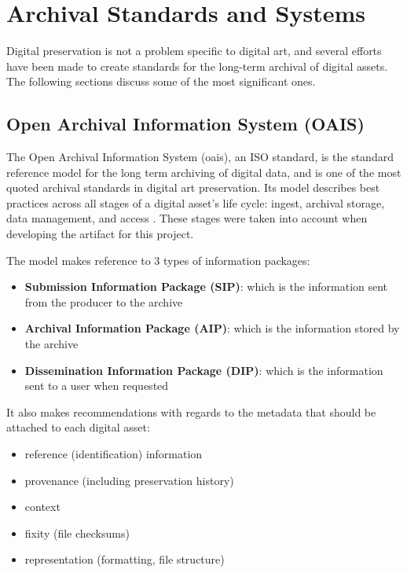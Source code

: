 \section{Archival Standards and Systems}

Digital preservation is not a problem specific to digital art, and several efforts have been made to create standards for the long-term archival of digital assets. The following sections discuss some of the most significant ones.

\subsection{Open Archival Information System (OAIS)}
\label{sub:oais}

The Open Archival Information System (\gls{oais}), an ISO standard, is the standard reference model for the long term archiving of digital data, and is one of the most quoted archival standards in digital art preservation. Its model describes best practices across all stages of a digital asset's life cycle: ingest, archival storage, data management, and access \cite{ccsdsReferenceModelOpen2012}. These stages were taken into account when developing the artifact for this project.

The model makes reference to 3 types of information packages:

\begin{itemize}
    \item \textbf{Submission Information Package (SIP)}: which is the information sent from the producer to the archive 
    \item \textbf{Archival Information Package (AIP)}: which is the information stored by the archive
    \item \textbf{Dissemination Information Package (DIP)}: which is the information sent to a user when requested
\end{itemize}

It also makes recommendations with regards to the metadata that should be attached to each digital asset:

\begin{itemize}
    \item reference (identification) information
    \item provenance (including preservation history)
    \item context
    \item fixity (file checksums)
    \item representation (formatting, file structure)
\end{itemize}


